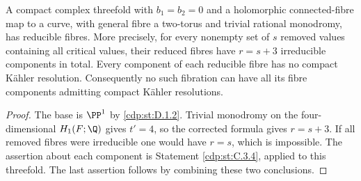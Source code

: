 
\begin{proposition}\label{cdp:st:D.2.1}
A compact complex threefold with $b_1=b_2=0$ and a holomorphic
connected-fibre map to a curve, with general fibre a two-torus and
trivial rational monodromy, has reducible fibres. More precisely,
for every nonempty set of $s$ removed values containing all critical
values, their reduced fibres have $r=s+3$ irreducible components in
total. Every component of each reducible fibre has no compact
K\"ahler resolution. Consequently no such fibration can have all
its fibre components admitting compact K\"ahler resolutions.
\end{proposition}
\begin{proof}
The base is $\PP^1$ by \ref{cdp:st:D.1.2}. Trivial monodromy on the
four-dimensional $H_1(F;\Q)$ gives $t'=4$, so the corrected formula
gives $r=s+3$. If all removed fibres were irreducible one would have
$r=s$, which is impossible. The assertion about each component is
Statement \ref{cdp:st:C.3.4}, applied to this threefold. The last assertion follows
by combining these two conclusions.
\end{proof}


